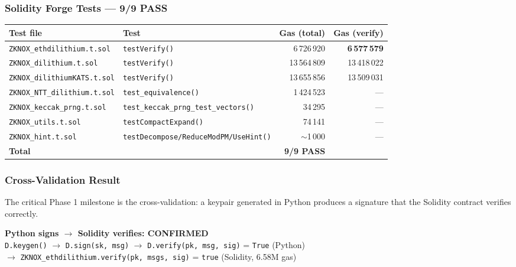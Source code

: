 \documentclass[11pt,a4paper]{article}
\begin{document}
\subsubsection{Solidity Forge Tests — 9/9 PASS}

\begin{center}
\begin{tabular}{llrr}
\toprule
\textbf{Test file} & \textbf{Test} & \textbf{Gas (total)} & \textbf{Gas (verify)} \\
\midrule
\texttt{ZKNOX\_ethdilithium.t.sol} & \texttt{testVerify()} & 6\,726\,920 & \textcolor{suva-blue}{\textbf{6\,577\,579}} \\
\texttt{ZKNOX\_dilithium.t.sol} & \texttt{testVerify()} & 13\,564\,809 & 13\,418\,022 \\
\texttt{ZKNOX\_dilithiumKATS.t.sol} & \texttt{testVerify()} & 13\,655\,856 & 13\,509\,031 \\
\texttt{ZKNOX\_NTT\_dilithium.t.sol} & \texttt{test\_equivalence()} & 1\,424\,523 & — \\
\texttt{ZKNOX\_keccak\_prng.t.sol} & \texttt{test\_keccak\_prng\_test\_vectors()} & 34\,295 & — \\
\texttt{ZKNOX\_utils.t.sol} & \texttt{testCompactExpand()} & 74\,141 & — \\
\texttt{ZKNOX\_hint.t.sol} & \texttt{testDecompose/ReduceModPM/UseHint()} & $\sim$1\,000 & — \\
\midrule
\multicolumn{2}{l}{\textbf{Total}} & \textbf{9/9 PASS} & \\
\bottomrule
\end{tabular}
\end{center}

\subsubsection{Cross-Validation Result}

The critical Phase 1 milestone is the cross-validation: a keypair generated in Python produces a signature that the Solidity contract verifies correctly.

\begin{resultbox}
\textbf{Python signs $\rightarrow$ Solidity verifies: CONFIRMED}\\[4pt]
\texttt{D.keygen()} $\rightarrow$ \texttt{D.sign(sk, msg)} $\rightarrow$ \texttt{D.verify(pk, msg, sig)} = \texttt{True} (Python)\\
$\rightarrow$ \texttt{ZKNOX\_ethdilithium.verify(pk, msgs, sig)} = \texttt{true} (Solidity, 6.58M gas)
\end{resultbox}
\end{document}

